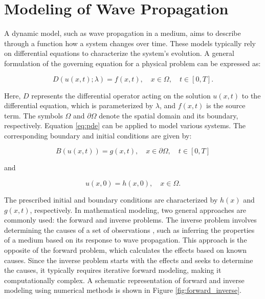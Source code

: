 \documentclass[11pt,twoside]{article}
\begin{document}
\section{Modeling of Wave Propagation}\label{sec:modeling_wave_propagation}

A dynamic model, such as wave propagation in a medium, aims to describe through a function how a system changes over time. 
These models typically rely on differential equations to characterize the system's evolution. A general formulation of 
the governing equation for a physical problem can be expressed as:

\begin{equation*}
D(u(x,t); \lambda) = f(x,t), \quad x \in \Omega, \quad t \in [0, T] .\label{eq:pde}
\end{equation*}
 
Here, $D$ represents the differential operator acting on the solution $u(x,t)$ to the differential equation, which is 
parameterized by $\lambda$, and $f(x,t)$ is the source term. The symbols $\Omega$ and $\partial\Omega$ denote the spatial 
domain and its boundary, respectively. Equation \ref{eq:pde} can be applied to model various systems. The corresponding 
boundary and initial conditions are given by:

\begin{equation*}
B (u(x, t)) = g(x, t), \quad x \in \partial \Omega, \quad t \in [0, T] 
\end{equation*}

and

\begin{equation*}
u(x, 0) = h(x, 0), \quad x \in \Omega .
\end{equation*}

The prescribed initial and boundary conditions are characterized by $h(x)$ and $g(x,t)$, respectively. In mathematical 
modeling, two general approaches are commonly used: the forward and inverse problems. The inverse problem involves 
determining the causes of a set of observations \citep{roth_neural_1994,Tarantola}, such as inferring the properties 
of a medium based on its response to wave propagation. This approach is the opposite of the forward problem, which 
calculates the effects based on known causes. Since the inverse problem starts with the effects and seeks to determine 
the causes, it typically requires iterative forward modeling, making it computationally complex. A schematic representation 
of forward and inverse modeling using numerical methods is shown in Figure \ref{fig:forward_inverse}.
\end{document}
